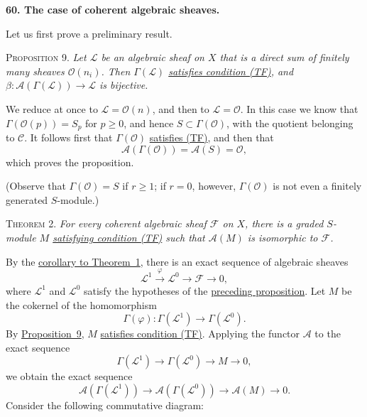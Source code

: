 
\label{fac:III:2:no:60}
\textbf{60. The case of coherent algebraic sheaves.}

Let us first prove a preliminary result.

\label{fac:III:2:no:60:prop:9}
\textsc{Proposition 9.} \textit{Let $\mathcal{L}$ be an algebraic sheaf
on $X$ that is a direct sum of finitely many sheaves $\mathcal{O}(n_i)$.
Then $\Gamma(\mathcal{L})$
\hyperref[fac:III:2:no:56:def:TF]{satisfies condition (TF)}, and
$\hyperref[fac:III:2:no:59:def:beta]{\beta}:
\mathcal{A}(\Gamma(\mathcal{L}))\to\mathcal{L}$ is bijective.}

We reduce at once to $\mathcal{L}=\mathcal{O}(n)$, and then to
$\mathcal{L}=\mathcal{O}$. In this case we know that
$\Gamma(\mathcal{O}(p))=S_p$ for $p\geq0$, and hence
$S\subset\Gamma(\mathcal{O})$, with the quotient belonging to
$\mathcal{C}$. It follows first that $\Gamma(\mathcal{O})$
\hyperref[fac:III:2:no:56:def:TF]{satisfies (TF)}, and then that
\[
\mathcal{A}(\Gamma(\mathcal{O}))=
\mathcal{A}(S)=\mathcal{O},
\]
which proves the proposition.

(Observe that $\Gamma(\mathcal{O})=S$ if $r\geq1$; if $r=0$, however,
$\Gamma(\mathcal{O})$ is not even a finitely generated $S$-module.)

\label{fac:III:2:no:60:theorem:2}
\textsc{Theorem 2.} \textit{For every coherent algebraic sheaf
$\mathcal{F}$ on $X$, there is a graded $S$-module $M$
\hyperref[fac:III:2:no:56:def:TF]{satisfying condition (TF)} such that
$\mathcal{A}(M)$ is isomorphic to
$\mathcal{F}$.}

By the \hyperref[fac:III:2:no:55:corollary]{corollary to Theorem~1},
there is an exact sequence of algebraic sheaves
\label{fac:III:2:no:60:formula:sheaf-presentation}
\[
\mathcal{L}^1\xrightarrow{\varphi}\mathcal{L}^0
\longrightarrow\mathcal{F}\longrightarrow0,
\]
where $\mathcal{L}^1$ and $\mathcal{L}^0$ satisfy the hypotheses of the
\hyperref[fac:III:2:no:60:prop:9]{preceding proposition}. Let $M$ be the
cokernel of the homomorphism
\label{fac:III:2:no:60:formula:Gamma-phi}
\[
\Gamma(\varphi):\Gamma(\mathcal{L}^1)
\longrightarrow\Gamma(\mathcal{L}^0).
\]
By \hyperref[fac:III:2:no:60:prop:9]{Proposition~9}, $M$
\hyperref[fac:III:2:no:56:def:TF]{satisfies condition (TF)}. Applying the
functor $\mathcal{A}$ to the exact sequence
\label{fac:III:2:no:60:formula:module-cokernel}
\[
\Gamma(\mathcal{L}^1)\longrightarrow
\Gamma(\mathcal{L}^0)\longrightarrow M\longrightarrow0,
\]
we obtain the exact sequence
\label{fac:III:2:no:60:formula:sheafified-cokernel}
\[
\mathcal{A}(\Gamma(\mathcal{L}^1))\longrightarrow
\mathcal{A}(\Gamma(\mathcal{L}^0))\longrightarrow
\mathcal{A}(M)\longrightarrow0.
\]
Consider the following commutative diagram:


